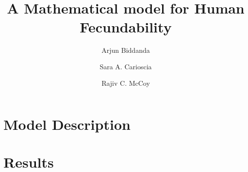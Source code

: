 \documentclass{article}
\title{A Mathematical model for Human Fecundability}
\author[1+,*]{Arjun Biddanda}
\author[1]{Sara A. Carioscia}
\author[1]{Rajiv C. McCoy}
\affil[1]{Department of Biology, Johns Hopkins University}
\begin{document}
\maketitle

\section*{Model Description}



\section*{Results}






\end{document}
